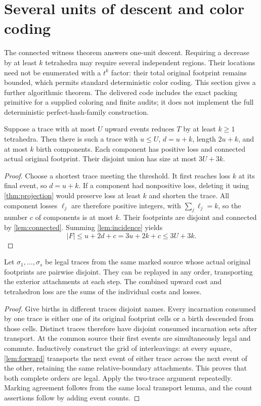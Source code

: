 \section{Several units of descent and color coding}\label{sec:multiunit}

The connected witness theorem answers one-unit descent. Requiring a decrease
by at least $k$ tetrahedra may require several independent regions. Their
locations need not be enumerated with a $t^k$ factor: their total original
footprint remains bounded, which permits standard deterministic color coding.
This section gives a further algorithmic theorem. The delivered code includes
the exact packing primitive for a supplied coloring and finite audits; it does
not implement the full deterministic perfect-hash-family construction.

\begin{theorem}\label{thm:k-local}
Suppose a trace with at most $U$ upward events reduces $T$ by at least
$k\ge1$ tetrahedra. Then there is such a trace with $u\le U$, $d=u+k$,
length $2u+k$, and at most $k$ birth components. Each component has positive
loss and connected actual original footprint. Their disjoint union has size
at most $3U+3k$.
\end{theorem}
\begin{proof}
Choose a shortest trace meeting the threshold. It first reaches loss $k$
at its final event, so $d=u+k$. If a component had nonpositive loss, deleting
it using \cref{thm:projection} would preserve loss at least $k$ and shorten
the trace. All component losses $\ell_j$ are therefore positive integers,
with $\sum_j\ell_j=k$, so the number $c$ of components is at most $k$.
Their footprints are disjoint and connected by \cref{lem:connected}. Summing
\cref{lem:incidence} yields
\[
 |F|\le u+2d+c=3u+2k+c\le3U+3k.
\]
\end{proof}

\begin{lemma}\label{lem:compose}
Let $\sigma_1,\ldots,\sigma_s$ be legal traces from the same marked source
whose actual original footprints are pairwise disjoint. They can be replayed
in any order, transporting the exterior attachments at each step. The
combined upward cost and tetrahedron loss are the sums of the individual
costs and losses.
\end{lemma}
\begin{proof}
Give births in different traces disjoint names. Every incarnation consumed
by one trace is either one of its original footprint cells or a birth
descended from those cells. Distinct traces therefore have disjoint consumed
incarnation sets after transport. At the common source their first events
are simultaneously legal and commute. Inductively construct the grid of
interleavings: at every square, \cref{lem:forward} transports the next event
of either trace across the next event of the other, retaining the same
relative-boundary attachments. This proves that both complete orders are
legal. Apply the two-trace argument repeatedly. Marking agreement follows
from the same local transport lemma, and the count assertions follow by
adding event counts.
\end{proof}

